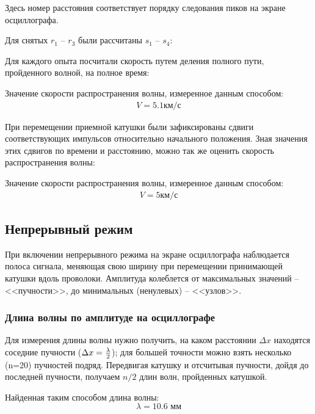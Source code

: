 Здесь номер расстояния соответствует порядку следования пиков на экране осциллографа. 

Для снятых $r_1$ -- $r_3$ были рассчитаны $s_1$ -- $s_4$:



Для каждого опыта посчитали скорость путем деления полного пути, пройденного волной, на полное время:




Значение скорости распространения волны, измеренное данным способом:
\begin{gather*}
	V=5.1\text{км/с}
\end{gather*}


При перемещении приемной катушки были зафиксированы сдвиги соответствующих импульсов относительно начального положения. Зная значения этих сдвигов по времени и расстоянию, можно так же оценить скорость распространения волны:



Значение скорости распространения волны, измеренное данным способом:
\begin{gather*}
	V=5\text{км/с}
\end{gather*}


\subsection{Непрерывный режим}

При включении непрерывного режима на экране осциллографа наблюдается полоса сигнала, меняющая свою ширину при перемещении принимающей катушки вдоль проволоки. Амплитуда колеблется от максимальных значений – <<пучности>>, до минимальных (ненулевых) – <<узлов>>. 

\subsubsection{Длина волны по амплитуде на осциллографе}

Для измерения длины волны нужно получить, на каком расстоянии $\Delta x$ находятся соседние пучности ($\Delta x = {\lambda\over2}$); для большей точности можно взять несколько (n=20) пучностей подряд. Передвигая катушку и отсчитывая пучности, дойдя до последней пучности, получаем $n/2$ длин волн, пройденных катушкой.

Найденная таким способом длина волны:
\begin{equation}
	\lambda=10.6 \text{ мм}
\end{equation}


